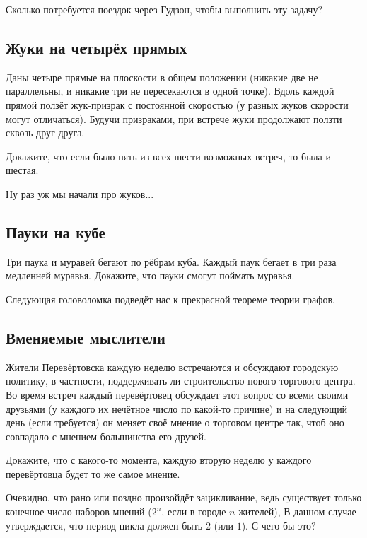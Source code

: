 Сколько потребуется поездок через Гудзон, чтобы выполнить эту задачу?

\subsection*{Жуки на четырёх прямых}

Даны четыре прямые на плоскости в общем положении (никакие две не параллельны, и никакие три не пересекаются в одной точке).
Вдоль каждой прямой ползёт жук-призрак с постоянной скоростью (у разных жуков скорости могут отличаться).
Будучи призраками, при встрече жуки продолжают ползти сквозь друг друга.

Докажите, что если было пять из всех шести возможных встреч,
то была и шестая.

\medskip

Ну раз уж мы начали про жуков...

\subsection*{Пауки на кубе}

Три паука и муравей бегают по рёбрам куба.
Каждый паук бегает в три раза медленней муравья.
Докажите, что пауки смогут поймать муравья.

\medskip

Следующая головоломка подведёт нас к прекрасной теореме теории графов.

\subsection*{Вменяемые мыслители}

Жители Перевёртовска каждую неделю встречаются и обсуждают городскую политику, в частности, поддерживать ли строительство нового торгового центра.
Во время встреч каждый перевёртовец обсуждает этот вопрос со всеми своими друзьями (у каждого их нечётное число по какой-то причине) и на следующий день (если требуется) он меняет своё мнение о торговом центре так, чтоб оно совпадало с мнением большинства его друзей.

Докажите, что с какого-то момента, каждую вторую неделю у каждого перевёртовца будет то же самое мнение.

Очевидно, что рано или поздно произойдёт зацикливание, ведь существует только конечное число наборов мнений ($2^n$, если в городе $n$ жителей), 
В данном случае утверждается, что период цикла должен быть $2$ (или $1$).
С чего бы это?

